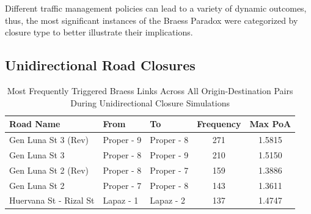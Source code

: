 Different traffic management policies can lead to a variety of dynamic outcomes, thus, the most significant instances of the Braess Paradox were categorized by closure type to better illustrate their implications.

\subsection{Unidirectional Road Closures}
\label{sec:unidirectional_closures}


\begin{table}[H]
    \centering
    \renewcommand{\thetable}{4.1a}

    \begin{tabular}{|l|l|l|c|c|}
    \hline
    \textbf{Road Name} & \textbf{From} & \textbf{To} & \textbf{Frequency} & \textbf{Max PoA} \\ \hline
    Gen Luna St 3 (Rev) & Proper - 9 & Proper - 8 & 271 & 1.5815 \\ \hline
    Gen Luna St 3 & Proper - 8 & Proper - 9 & 210 & 1.5150 \\ \hline
    Gen Luna St 2 (Rev) & Proper - 8 & Proper - 7 & 159 & 1.3886 \\ \hline
    Gen Luna St 2 & Proper - 7 & Proper - 8 & 143 & 1.3611 \\ \hline
    Huervana St - Rizal St & Lapaz - 1 & Lapaz - 2 & 137 & 1.4747 \\ \hline
    \end{tabular}
    \caption{Most Frequently Triggered Braess Links Across All Origin-Destination Pairs During Unidirectional Closure Simulations}
    \label{tab:5.1a}
\end{table}

